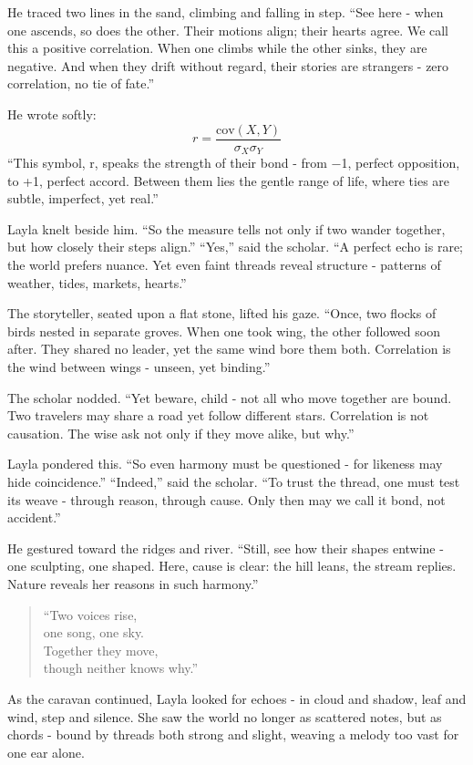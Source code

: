 \documentclass[
  letterpaper,
  DIV=11,
  numbers=noendperiod]{scrreprt}
\begin{document}
He traced two lines in the sand, climbing and falling in step. ``See
here - when one ascends, so does the other. Their motions align; their
hearts agree. We call this a positive correlation. When one climbs while
the other sinks, they are negative. And when they drift without regard,
their stories are strangers - zero correlation, no tie of fate.''

He wrote softly: \[
r = \frac{\text{cov}(X,Y)}{σ_X σ_Y}
\] ``This symbol, r, speaks the strength of their bond - from −1,
perfect opposition, to +1, perfect accord. Between them lies the gentle
range of life, where ties are subtle, imperfect, yet real.''

Layla knelt beside him. ``So the measure tells not only if two wander
together, but how closely their steps align.'' ``Yes,'' said the
scholar. ``A perfect echo is rare; the world prefers nuance. Yet even
faint threads reveal structure - patterns of weather, tides, markets,
hearts.''

The storyteller, seated upon a flat stone, lifted his gaze. ``Once, two
flocks of birds nested in separate groves. When one took wing, the other
followed soon after. They shared no leader, yet the same wind bore them
both. Correlation is the wind between wings - unseen, yet binding.''

The scholar nodded. ``Yet beware, child - not all who move together are
bound. Two travelers may share a road yet follow different stars.
Correlation is not causation. The wise ask not only if they move alike,
but why.''

Layla pondered this. ``So even harmony must be questioned - for likeness
may hide coincidence.'' ``Indeed,'' said the scholar. ``To trust the
thread, one must test its weave - through reason, through cause. Only
then may we call it bond, not accident.''

He gestured toward the ridges and river. ``Still, see how their shapes
entwine - one sculpting, one shaped. Here, cause is clear: the hill
leans, the stream replies. Nature reveals her reasons in such harmony.''

\begin{quote}
``Two voices rise,\\
one song, one sky.\\
Together they move,\\
though neither knows why.''
\end{quote}

As the caravan continued, Layla looked for echoes - in cloud and shadow,
leaf and wind, step and silence. She saw the world no longer as
scattered notes, but as chords - bound by threads both strong and
slight, weaving a melody too vast for one ear alone.
\end{document}
